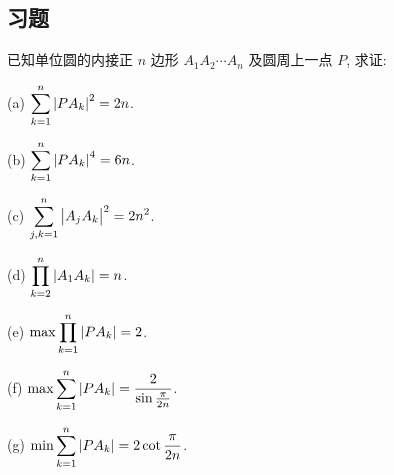 \subsection{习题}
\begin{exercise}
	已知单位圆的内接正 $n$ 边形 $A_1 A_2 \cdots A_n$ 及圆周上一点 $P$, 求证:
\begin{multicols}{2}
	(a) $\displaystyle\sum_{k=1}^n\left|P A_k\right|^2=2 n$.

	(b) $\displaystyle\sum_{k=1}^n\left|P A_k\right|^4=6 n$.

	(c) $\displaystyle\sum_{j, k=1}^n\left|A_j A_k\right|^2=2 n^2$.

	(d) $\displaystyle\prod_{k=2}^n\left|A_1 A_k\right|=n$.

	(e) $\max \displaystyle\prod_{k=1}^n\left|P A_k\right|=2$.

	(f) $\max \displaystyle\sum_{k=1}^n\left|P A_k\right|=\frac{2}{\sin \frac{\pi}{2 n}}$.

	(g) $\min \displaystyle\sum_{k=1}^n\left|P A_k\right|=2 \cot \frac{\pi}{2 n}$.
\end{multicols}
	
\end{exercise}
